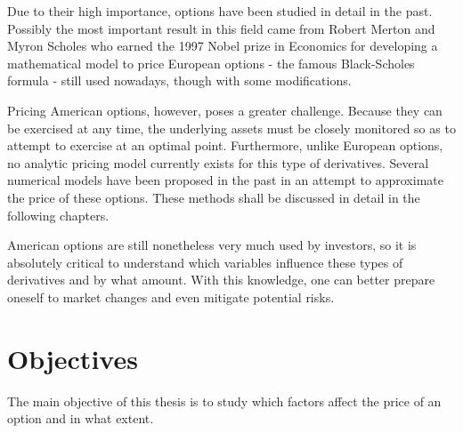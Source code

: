 \documentclass[a4paper,prd,twocolumn,nofootinbib,superscriptaddress,floatfix]{revtex4}
\begin{document}

Due to their high importance, options have been studied in detail in the past.
Possibly the most important result in this field came from Robert Merton and Myron Scholes who earned the 1997 Nobel prize in Economics for developing a mathematical model to price European options - the famous Black-Scholes formula - still used nowadays, though with some modifications.

Pricing American options, however, poses a greater challenge. Because they can be exercised at any time, the underlying assets must be closely monitored so as to attempt to exercise at an optimal point.
Furthermore, unlike European options, no analytic pricing model currently exists for this type of derivatives. Several numerical models have been proposed in the past in an attempt to approximate the price of these options. These methods shall be discussed in detail in the following chapters.

American options are still nonetheless very much used by investors, so it is absolutely critical to understand which variables influence these types of derivatives and by what amount. With this knowledge, one can better prepare oneself to market changes and even mitigate potential risks.

\section{Objectives}
The main objective of this thesis is to study which factors affect the price of an option and in what extent.
\end{document}
